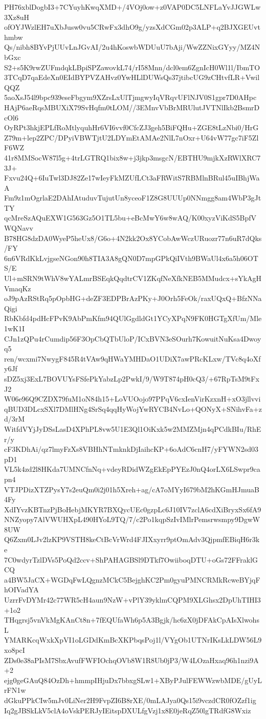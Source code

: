 PH76xblDogbI3+7CYuyhKwqXMD+/4VOj0ow+z0VAP0DC5LNFLaYvJJGWLw3Xz8uH
ofOYJWzlEH7uXbJusw0vu5CRwFx3dhO9g/yzsXdCGm02p3ALP+q2BJXGEUvthmbw
Qs/nibh8BYvPjUUvLnJGvAI/2u4hKoswbWDUuU7bAji/WwZZNixGYyy/MZ4NbGxc
S2+s5K9rwZUFmdqkLBpiSPZawovkL74/rI58Mnn/dcl0em6ZgnIcH0Wl1l/IbmTO
3TCqD7qaEdeXn0EIdBYPVZAHvz0YwHLlDUWsQs37jtibcUG9zCHtvfLR+VwilQQZ
5aoXsJ54l9bpc939eseFbgym9XZrsLxUlTjmgwyIqVRqvUFlNJV0S1gpr7D0AHpc
HAjP6aeRqsMBUXiX79SvHqfm0tLOM//3EMnvVbBrMRUlutJVTNlIkb2BsmrDcOl6
OyRPt3hkjEPLfRoMtlyquhHr6VI6vvf0CfcZJ3geh5BiFQHu+ZGE8tLzNbi0/HrG
Z79m+lep2ZPC/DPyiVBWTjtU2LDYmEtAMAe2NlL7nOxr+U64vW77gc7iF5ZlF6WZ
41r8MMSocW87l5g+4trLGTRQ1bix8w+j3jkp3msgcN/EBTHU9mjkXzRWlXRC73J+
Fxvu24Q+6IuTwl3DJ82Ze17wIeyFkMZUfLCt3aFRWitS7RBMlnBRul45uIBhjWaA
Fm9z1mOgrlaE2DAhIAtuduvTujutUn8yceoF1Z8G8UUUp0NNmgg8am4WbP3gJtTY
qcMreSzAQuEXW1G563Gz5O1TL5bu+eBcMwY6w8wAQ/K00xyzViKdS5BpfVWQNavv
B78HG8dzDA0WyeP5heUx8/G6o+4N2kk2Ox8YCobAwWczURuozr77n6uR7dQks/FY
6n6VRdKkLvjgseNGon90h8TIA3A8gQN0D7mpGPkQiIVth9BWaUl4x6a5h06OTS/E
Ul+mSRN9tWhV8wYALmrBSEqkQqdtrCV1ZKqfNeXfkNEB5MMudcx+sYkAgHVmaqKz
oJ9pAzRStRq5pOpbHG+deZF3EDPBrAzPKy+J0Orh5FeOk/raxUQxQ+BfzNNaQigi
RbKbfd4pdHcFPvK9AbPmKfm94QUlGgdldGt1YCyXPqN9FK0HGTgXfUm/Mle1wK1I
CJn1zQPu4rCumdip56F3OpCbQTbUloP/ICxBVN3eSOurh7KowuitNuKsa4Dwoyq5
ren/wcxmi7NwygF845R4tVAw9qHWaYMHDaO1UDiX7awPRcKLxw/TVc8q4oXfy6Jf
sDZ5xj3ExL7BOVUYsFSfePkYabzLp2PwkI/9/W9T874pH0cQ3/+67RpTsM9tFxJ2
W06e96Q9CZDX79fuM1oN84h15+LoVUOojo97PPqV6cxIenVirKzxnH+xO3jllvvi
qBUD3DLcxSXl7DMlHNg4SrSq4qqHyWojYwRYCB4NvLo+QONyX+SNihvFa+zd/3rM
WitfdVYjJyDSsLasD4XPhPL8vw5U1E3Ql1OiKxk5w2MMZMjn4qPCdkBIu/RhEr/y
cF3KDhAi/qz7lmyFzXs8VBHhNTmknkDjIaihcKP+6oAdC6cnH7/yFYWN2sd03pD1
VL5k4zd2l8HKda7UMNCfnNq+vdeyRDidWZgEkEpPYEzJ0nQ4orLX6LSwpr9capn4
VTJPDizXTZPysY7s2euQm0i2j01h5Xreh+ag/cA7oMYyI679bM2hKGmHJmuaB4Fy
XdIYvzKBTnzPjBoHebjMKYR7BXQycUEc0gzpLc6J10IV7zclA6cdXiBryxSx6fA9
NNZyopy7AlVWUHXpL490HYoL9TQ/7/c2Po1kqpSzIvIMlrPemsrwsmpy9DgwW8UW
Q6Zxm0LJv2lzKP9VSTH8keCtBcVrWrd4FJIXxyrr9ptOmAdv3QjpmfEBiqH6r3ke
7C0wdyrTzlDVs5PoQd2ccv+ShPAHAGBSl9DTkf7OwiiboqDTU+oGs72FFraklGCQ
a4BW5JaCX+WGDqFwLQgnzMCkC5BejghKC2Pm0gyuPMNCRMkRcweBYjqFhOIVadYA
UzrrFvDYMr42c77WR5cH4aun9NzW+vPlY39yklmCQPM9XLGhsx2DpUhTIHI3+1o2
THqgrsj5vnVkMgKAnCt8n+7fEQUfaWh6p5A3Bgjk/hc6zX0jDFAkCpAIsXlwohsL
YMARKcqWxkXpVI1oLGDdKmBcXKPbqsPoj1l/VYgOb1UTNrIKsLkLDW56L9xo8pcI
ZDs0e38aPIsM7SbxAvufFWFIOchqOVb8W1R8Ub0jP3/W4LOzaHxaq96h1nzi9A+2
ejg0geGAuQ84OzDh+hmmpIHjuDx7bbxgSLw1+XByPJulFEWWzwbMDE/gUyLrFN1w
dGkuPPkCIw5mJv0LiNer2H9FvpZI6B8rXE/0mLAJya0Qs15i9vczdCR0fOZzf1ig
Iq2gJBSkLkV5clA4oVskPERJyIEitspDXULfgVzj1x8E0jeRqZ50lgTRdfG8Wxiz
